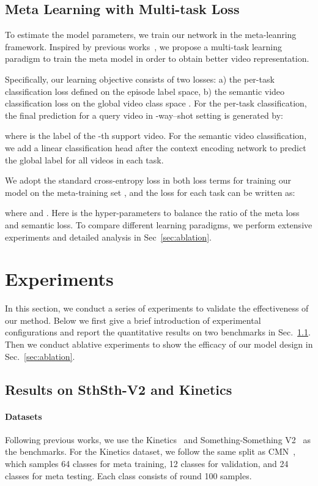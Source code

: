 \documentclass{article}
\begin{document}
\subsection{Meta Learning with Multi-task Loss}\label{sec:learning}
To estimate the model parameters, we train our network in the meta-leanring framework. Inspired by previous works~\cite{liu2020part,yan2019dual}, we propose a multi-task learning paradigm to train the meta model in order to obtain better video representation.

Specifically, our learning objective consists of two losses: a) the per-task classification loss defined on the episode label space, b) the semantic video classification loss on the global video class space .
For the per-task classification, the final prediction for a query video  in -way--shot setting is generated by:

where  is the label of the -th support video.
For the semantic video classification, we add a linear classification head after the context encoding network to predict the global label  for all videos in each task.
 
We adopt the standard cross-entropy loss in both loss terms for training our model on the meta-training set , and the loss for each task can be written as:

where  and . Here  is the hyper-parameters to balance the ratio of the meta loss and semantic loss. To compare different learning paradigms, we perform extensive experiments and detailed analysis in Sec~\ref{sec:ablation}.



 


\section{Experiments}\label{sec:cls_experiment}
In this section, we conduct a series of experiments to validate the effectiveness of our method.
Below we first give a brief introduction of experimental configurations and report the quantitative results on two benchmarks in Sec.~\ref{sec:configuration}. Then we conduct ablative experiments to show the efficacy of our model design in Sec.~\ref{sec:ablation}.


\subsection{Results on SthSth-V2 and Kinetics}\label{sec:configuration}
\paragraph{Datasets}
Following previous works, we use the Kinetics~\cite{Carreira_2017_CVPR} and Something-Something V2~\cite{goyal2017something} as the benchmarks. For the Kinetics dataset, we follow the same split as CMN~\cite{zhu2018compound}, which samples 64 classes for meta training, 12 classes for validation, and 24 classes for meta testing. Each class consists of round 100 samples. 
\end{document}
